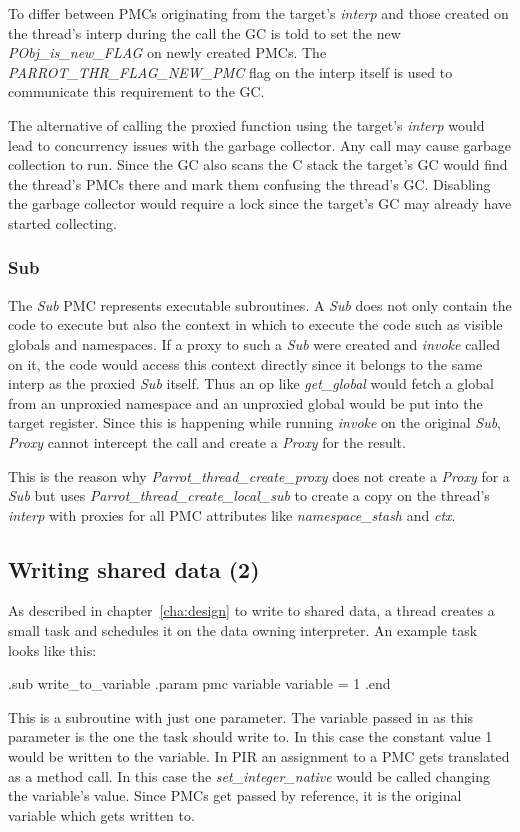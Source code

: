 \documentclass[bachelor,english]{hgbthesis}
\begin{document}
To differ between PMCs originating from the target's \textit{interp} and those created on the thread's interp during the call the GC is told to set the new \textit{PObj\_is\_new\_FLAG} on newly created PMCs. The \textit{PARROT\_THR\_FLAG\_NEW\_PMC} flag on the interp itself is used to communicate this requirement to the GC.

The alternative of calling the proxied function using the target's \textit{interp} would lead to concurrency issues with the garbage collector. Any call may cause garbage collection to run. Since the GC also scans the C stack the target's GC would find the thread's PMCs there and mark them confusing the thread's GC. Disabling the garbage collector would require a lock since the target's GC may already have started collecting.

\subsubsection{Sub}

The \textit{Sub} PMC represents executable subroutines. A \textit{Sub} does not only contain the code to execute but also the context in which to execute the code such as visible globals and namespaces. If a proxy to such a \textit{Sub} were created and \textit{invoke} called on it, the code would access this context directly since it belongs to the same interp as the proxied \textit{Sub} itself. Thus an op like \textit{get\_global} would fetch a global from an unproxied namespace and an unproxied global would be put into the target register. Since this is happening while running \textit{invoke} on the original \textit{Sub}, \textit{Proxy} cannot intercept the call and create a \textit{Proxy} for the result.

This is the reason why \textit{Parrot\_thread\_create\_proxy} does not create a \textit{Proxy} for a \textit{Sub} but uses \textit{Parrot\_thread\_create\_local\_sub} to create a copy on the thread's \textit{interp} with proxies for all PMC attributes like \textit{namespace\_stash} and \textit{ctx}.

\subsection{Writing shared data (2)}

As described in chapter~\ref{cha:design} to write to shared data, a thread creates a small task and schedules it on the data owning interpreter. An example task looks like this:
%
\begin{GenericCode}
.sub write_to_variable
    .param pmc variable
    variable = 1
.end
\end{GenericCode}
%
This is a subroutine with just one parameter. The variable passed in as this parameter is the one the task should write to. In this case the constant value 1 would be written to the variable. In PIR an assignment to a PMC gets translated as a method call. In this case the \textit{set\_integer\_native} would be called changing the variable's value. Since PMCs get passed by reference, it is the original variable which gets written to.
\end{document}
